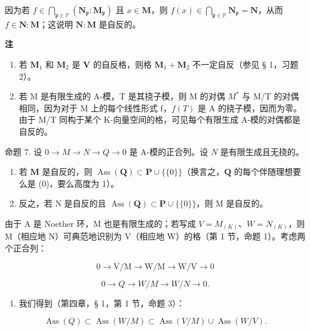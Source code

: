 因为若 \(f \in \bigcap_{\mathfrak{p} \in \mathbb{P}} (\mathbf{N}_{\mathfrak{p}}: \mathbf{M}_{\mathfrak{p}})\) 且 \(x \in \mathbf{M}\)，则 \(f(x) \in \bigcap_{\mathfrak{p} \in \mathbb{P}} \mathbf{N}_{\mathfrak{p}} = \mathbf{N}\)，从而 \(f \in \mathbf{N}: \mathbf{M}\)；这说明 \(\mathbf{N}: \mathbf{M}\) 是自反的。

\textbf{注}\par

\begin{enumerate}
\def\labelenumi{(\arabic{enumi})}
\setcounter{enumi}{1}
\item
  若 \(\mathbf{M}_1\) 和 \(\mathbf{M}_2\) 是 \(\mathbf{V}\) 的自反格，则格 \(\mathbf{M}_1 + \mathbf{M}_2\) 不一定自反（参见 § 1，习题 2）。
\item
  若 M 是有限生成的 A-模，T 是其挠子模，则 M 的对偶 \(M^{*}\) 与 M/T 的对偶相同，因为对于 M 上的每个线性形式 f，\(f(T)\) 是 A 的挠子模，因而为零。由于 M/T 同构于某个 K-向量空间的格，可见每个有限生成 A-模的对偶都是自反的。
\end{enumerate}

命题 7. 设 \(0 \to M \to N \to Q \to 0\) 是 A-模的正合列。设 \(N\) 是有限生成且无挠的。

\begin{enumerate}
\def\labelenumi{(\roman{enumi})}
\item
若 \(\mathbf{M}\) 是自反的，则 \(\operatorname{Ass}(\mathbf{Q}) \subset \mathbf{P} \cup \{\{0\}\}\)（换言之，\(\mathbf{Q}\) 的每个伴随理想要么是 (0)，要么高度为 1）。
\item
  反之，若 N 是自反的且 \(\operatorname{Ass}(\mathbf{Q}) \subset \mathbf{P} \cup \{\{0\}\}\)，则 M 是自反的。
\end{enumerate}

由于 A 是 Noether 环，M 也是有限生成的；若写成 \(V = M_{(K)}\)、\(W = N_{(K)}\)，则 M（相应地 N）可典范地识别为 V（相应地 W）的格（第 1 节，命题 1）。考虑两个正合列：

\[
0 \rightarrow \mathrm{V} / \mathrm{M} \rightarrow \mathrm{W} / \mathrm{M} \rightarrow \mathrm{W} / \mathrm{V} \rightarrow 0
\]

\[
0 \rightarrow Q \rightarrow W / M \rightarrow W / N \rightarrow 0.
\]

\begin{enumerate}
\def\labelenumi{(\roman{enumi})}
\tightlist
\item
  我们得到（第四章，§ 1，第 1 节，命题 3）：
\end{enumerate}

\[
\operatorname{Ass} (Q) \subset \operatorname{Ass} (W / M) \subset \operatorname{Ass} (V / M) \cup \operatorname{Ass} (W / V).
\]

